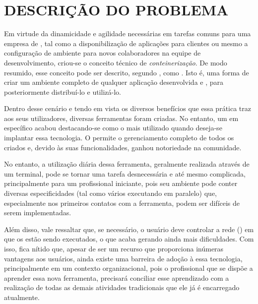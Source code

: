 
\chapter{DESCRIÇÃO DO PROBLEMA}
\label{chap:descricao_do_problema}

Em virtude da dinamicidade e agilidade necessárias em tarefas comuns para uma empresa de \software{}, tal como a disponibilização de aplicações para clientes ou mesmo a configuração de ambiente para novos colaboradores na equipe de desenvolvimento, criou-se o conceito técnico de \textit{conteinerização}. De modo resumido, esse conceito pode ser descrito, segundo \cite{Fernandes18}, como . Isto é, uma forma de criar um ambiente completo de qualquer aplicação desenvolvida e , para posteriormente distribuí-lo e utilizá-lo. 

Dentro desse cenário e tendo em vista os diversos benefícios que essa prática traz aos seus utilizadores, diversas ferramentas foram criadas. No entanto, um \software{} em específico acabou destacando-se como o mais utilizado quando deseja-se implantar essa tecnologia. O \textbf{\docker{}} permite o gerenciamento completo de todos os \containers{} criados e, devido às suas funcionalidades, ganhou notoriedade na comunidade. 

No entanto, a utilização diária dessa ferramenta, geralmente realizada através de um terminal, pode se tornar uma tarefa desnecessária e até mesmo complicada, principalmente para um profissional iniciante, pois seu ambiente pode conter diversas especificidades (tal como vários \containers{} executando em paralelo) que, especialmente nos primeiros contatos com a ferramenta, podem ser difíceis de serem implementadas.

Além disso, vale ressaltar que, se necessário, o usuário deve controlar a rede (\dockerNetwork{}) em que os \containers{} estão sendo executados, o que acaba gerando ainda mais dificuldades. Com isso, fica nítido que, apesar de ser um recurso que proporciona inúmeras vantagens aos usuários, ainda existe uma barreira de adoção à essa tecnologia, principalmente em um contexto organizacional, pois o profissional que se dispõe a aprender essa nova ferramenta, precisará conciliar esse aprendizado com a realização de todas as demais atividades tradicionais que ele já é encarregado atualmente.





